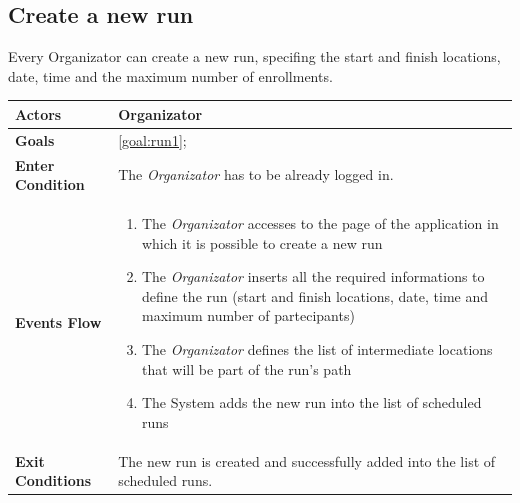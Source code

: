   \subsection{Create a new run}
Every Organizator can create a new run, specifing the start and finish locations, date, time and the maximum number of enrollments.

\begin{table}[H]
	\centering
    
    \begin{tabular}{|p{3.5cm}|p{10.3cm}|}
    
    \hline
    \textbf{\large{Actors}}  			& \tabitem Organizator 	\\
    				 					
    \hline
    \textbf{\large{Goals}} 				& \ref{goal:run1};\\
    
    \hline
    \textbf{\large{Enter Condition}}	& The \emph{Organizator} has to be already logged in.		\\
    
    \hline
    \textbf{\large{Events Flow}}		& \begin{enumerate}[leftmargin=0.5cm]
                                          	\item The \emph{Organizator}  accesses to the page of the application in which it is possible to create a new run
                                            \item The \emph{Organizator} inserts all the required informations to define the run (start and finish locations, date, time and maximum number of partecipants)
                                             \item The \emph{Organizator} defines the list of intermediate locations that will be part of the run's path
                                            \item The System adds the new run into the list of scheduled runs
                                           
                                          \end{enumerate}
    										\\
    \hline
    \textbf{\large{Exit Conditions}}    & The new run is created and successfully added into the list of scheduled runs.  \\
    

\end{tabular}
\end{table}

